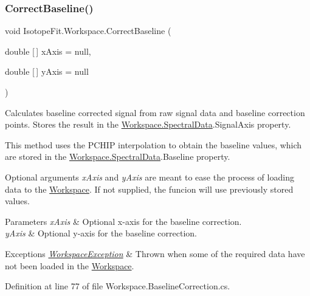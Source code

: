 \subsubsection{\texorpdfstring{Correct\+Baseline()}{CorrectBaseline()}}
{\footnotesize\ttfamily void Isotope\+Fit.\+Workspace.\+Correct\+Baseline (\begin{DoxyParamCaption}\item[{double \mbox{[}$\,$\mbox{]}}]{x\+Axis = {\ttfamily null},  }\item[{double \mbox{[}$\,$\mbox{]}}]{y\+Axis = {\ttfamily null} }\end{DoxyParamCaption})}



Calculates baseline corrected signal from raw signal data and baseline correction points. Stores the result in the \mbox{\hyperlink{class_isotope_fit_1_1_workspace_a1d6cc2dd07cbfe920da9f1bffc9b32c2}{Workspace.\+Spectral\+Data}}.Signal\+Axis property. 

This method uses the P\+C\+H\+IP interpolation to obtain the baseline values, which are stored in the \mbox{\hyperlink{class_isotope_fit_1_1_workspace_a1d6cc2dd07cbfe920da9f1bffc9b32c2}{Workspace.\+Spectral\+Data}}.Baseline property.

Optional arguments {\itshape x\+Axis}  and {\itshape y\+Axis}  are meant to ease the process of loading data to the \mbox{\hyperlink{class_isotope_fit_1_1_workspace}{Workspace}}. If not supplied, the funcion will use previously stored values.


\begin{DoxyParams}{Parameters}
{\em x\+Axis} & Optional x-\/axis for the baseline correction.\\
\hline
{\em y\+Axis} & Optional y-\/axis for the baseline correction.\\
\hline
\end{DoxyParams}

\begin{DoxyExceptions}{Exceptions}
{\em \mbox{\hyperlink{class_isotope_fit_1_1_workspace_exception}{Workspace\+Exception}}} & Thrown when some of the required data have not been loaded in the \mbox{\hyperlink{class_isotope_fit_1_1_workspace}{Workspace}}.\\
\hline
\end{DoxyExceptions}


Definition at line 77 of file Workspace.\+Baseline\+Correction.\+cs.

\mbox{\label{class_isotope_fit_1_1_workspace_a188d75c84db3eb6b5c3812e44eb95695}} 
